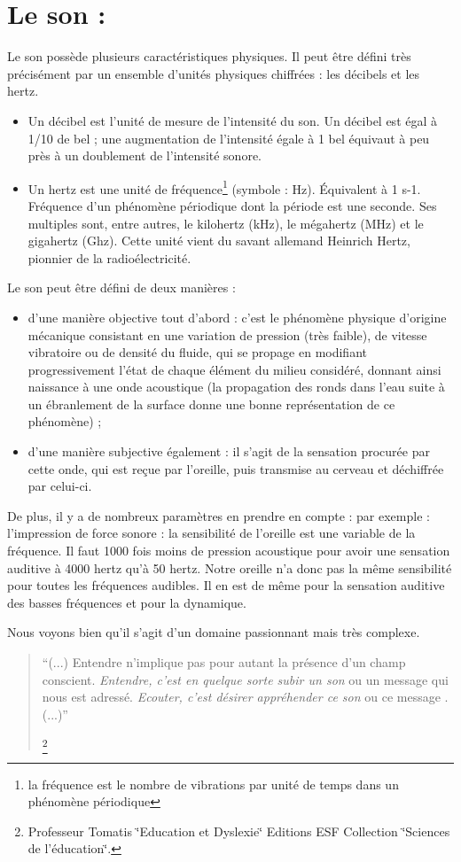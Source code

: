 \section{Le son :}

Le son possède plusieurs caractéristiques physiques. Il peut être
défini très précisément par un ensemble d'unités physiques chiffrées
: les décibels et les hertz. 
\begin{itemize}
\item Un décibel est l'unité de mesure de l'intensité du son. Un décibel
est égal à 1/10 de bel ; une augmentation de l'intensité égale à 1
bel équivaut à peu près à un doublement de l'intensité sonore. 
\item Un hertz est une unité de fréquence\footnote{la fréquence est le nombre de vibrations par unité de temps dans un
phénomène périodique} (symbole : Hz). Équivalent à 1 s-1. Fréquence d'un phénomène périodique
dont la période est une seconde. Ses multiples sont, entre autres,
le kilohertz (kHz), le mégahertz (MHz) et le gigahertz (Ghz). Cette
unité vient du savant allemand Heinrich Hertz, pionnier de la radioélectricité.
\end{itemize}
Le son peut être défini de deux manières : 
\begin{itemize}
\item d'une manière objective tout d'abord : c'est le phénomène physique
d'origine mécanique consistant en une variation de pression (très
faible), de vitesse vibratoire ou de densité du fluide, qui se propage
en modifiant progressivement l'état de chaque élément du milieu considéré,
donnant ainsi naissance à une onde acoustique (la propagation des
ronds dans l'eau suite à un ébranlement de la surface donne une bonne
représentation de ce phénomène) ; 
\item d'une manière subjective également : il s'agit de la sensation procurée
par cette onde, qui est reçue par l'oreille, puis transmise au cerveau
et déchiffrée par celui-ci.
\end{itemize}
De plus, il y a de nombreux paramètres en prendre en compte : par
exemple : l'impression de force sonore : la sensibilité de l'oreille
est une variable de la fréquence. Il faut 1000 fois moins de pression
acoustique pour avoir une sensation auditive à 4000 hertz qu'à 50
hertz. Notre oreille n'a donc pas la même sensibilité pour toutes
les fréquences audibles. Il en est de même pour la sensation auditive
des basses fréquences et pour la dynamique. 

Nous voyons bien qu'il s'agit d'un domaine passionnant mais très complexe.
\begin{quote}
``(...) Entendre n'implique pas pour autant la présence d'un champ
conscient.\emph{ Entendre, c\textquoteright est en quelque sorte subir
un son }ou un message qui nous est adressé. \emph{Ecouter, c'est désirer
appréhender ce son }ou ce message . (...)'' 

\footnote{Professeur Tomatis \char`\"{}Education et Dyslexie\char`\"{} Editions
ESF Collection \char`\"{}Sciences de l'éducation\char`\"{}.}
\end{quote}
